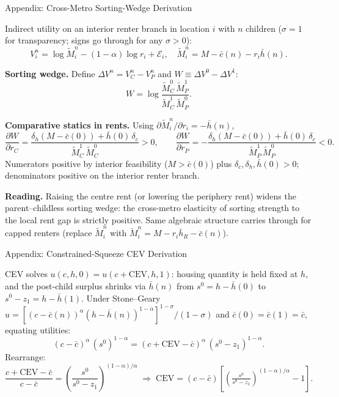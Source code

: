 \documentclass[11pt,aspectratio=169]{beamer}
\begin{document}
\begin{frame}{Appendix: Cross-Metro Sorting-Wedge Derivation \; \hyperlink{slide2-main}{}}
\label{app:wealth}
\footnotesize

Indirect utility on an interior renter branch in location $i$ with $n$ children ($\sigma=1$ for transparency; signs go through for any $\sigma > 0$):
\[
V_i^n = \log \tilde M_i^n - (1-\alpha)\log r_i + \mathcal E_i,
\quad
\tilde M_i^n = M - \bar c(n) - r_i \bar h(n).
\]

\vspace{0.4em}
\textbf{Sorting wedge.} Define $\Delta V^n = V_C^n - V_P^n$ and
$W \equiv \Delta V^0 - \Delta V^1$:
\[
W = \log\frac{\tilde M_C^0\,\tilde M_P^1}{\tilde M_C^1\,\tilde M_P^0}.
\]

\vspace{0.4em}
\textbf{Comparative statics in rents.} Using $\partial \tilde M_i^n/\partial r_i = -\bar h(n)$,
\[
\frac{\partial W}{\partial r_C}
= \frac{\delta_h(M-\bar c(0)) + \bar h(0)\,\delta_c}{\tilde M_C^1\,\tilde M_C^0} > 0,
\qquad
\frac{\partial W}{\partial r_P}
= -\frac{\delta_h(M-\bar c(0)) + \bar h(0)\,\delta_c}{\tilde M_P^1\,\tilde M_P^0} < 0.
\]
Numerators positive by interior feasibility ($M > \bar c(0)$) plus $\delta_c, \delta_h, \bar h(0) > 0$; denominators positive on the interior renter branch.

\vspace{0.4em}
\textbf{Reading.} Raising the centre rent (or lowering the periphery rent) widens the parent--childless sorting wedge: the cross-metro elasticity of sorting strength to the local rent gap is strictly positive. Same algebraic structure carries through for capped renters (replace $\tilde M_i^n$ with $\check M_i^n = M - r_i \bar h_R - \bar c(n)$).
\end{frame}

\begin{frame}{Appendix: Constrained-Squeeze CEV Derivation \; \hyperlink{lem3-main}{}}
\label{app:lem3-cev}
\small

CEV solves $u(c,h,0) = u(c+\mathrm{CEV}, h, 1)$: housing quantity is
held fixed at $h$, and the post-child surplus shrinks via
$\bar h(n)$ from $s^0 = h - \bar h(0)$ to $s^0 - z_1 = h - \bar h(1)$.
Under Stone--Geary
$u = [(c-\bar c(n))^\alpha(h-\bar h(n))^{1-\alpha}]^{1-\sigma}/(1-\sigma)$
and $\bar c(0) = \bar c(1) = \bar c$, equating utilities:
\[
(c - \bar c)^\alpha\, (s^0)^{1-\alpha}
= (c + \mathrm{CEV} - \bar c)^\alpha\, (s^0 - z_1)^{1-\alpha}.
\]
Rearrange:
\[
\frac{c + \mathrm{CEV} - \bar c}{c - \bar c}
= \left(\frac{s^0}{s^0 - z_1}\right)^{\!(1-\alpha)/\alpha}
\;\Longrightarrow\;
\mathrm{CEV} = (c - \bar c)\!\left[\!\left(\tfrac{s^0}{s^0-z_1}\right)^{\!(1-\alpha)/\alpha}\!\!-1\right].
\]

\end{frame}
\end{document}
